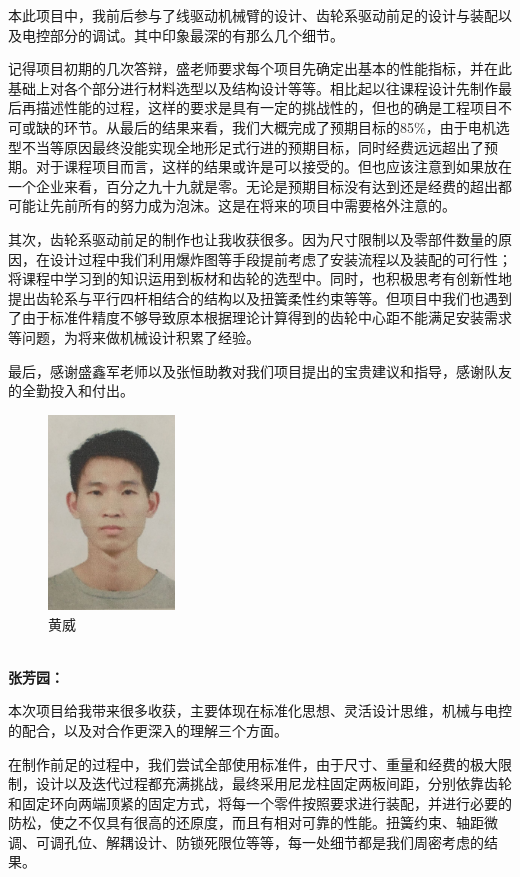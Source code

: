 \documentclass[12pt]{article}
\begin{document}
\begin{CJK}{UTF8}{gbsn}
本此项目中，我前后参与了线驱动机械臂的设计、齿轮系驱动前足的设计与装配以及电控部分的调试。其中印象最深的有那么几个细节。\par
记得项目初期的几次答辩，盛老师要求每个项目先确定出基本的性能指标，并在此基础上对各个部分进行材料选型以及结构设计等等。相比起以往课程设计先制作最后再描述性能的过程，这样的要求是具有一定的挑战性的，但也的确是工程项目不可或缺的环节。从最后的结果来看，我们大概完成了预期目标的85$\%$，由于电机选型不当等原因最终没能实现全地形足式行进的预期目标，同时经费远远超出了预期。对于课程项目而言，这样的结果或许是可以接受的。但也应该注意到如果放在一个企业来看，百分之九十九就是零。无论是预期目标没有达到还是经费的超出都可能让先前所有的努力成为泡沫。这是在将来的项目中需要格外注意的。\par
其次，齿轮系驱动前足的制作也让我收获很多。因为尺寸限制以及零部件数量的原因，在设计过程中我们利用爆炸图等手段提前考虑了安装流程以及装配的可行性；将课程中学习到的知识运用到板材和齿轮的选型中。同时，也积极思考有创新性地提出齿轮系与平行四杆相结合的结构以及扭簧柔性约束等等。但项目中我们也遇到了由于标准件精度不够导致原本根据理论计算得到的齿轮中心距不能满足安装需求等问题，为将来做机械设计积累了经验。\par
最后，感谢盛鑫军老师以及张恒助教对我们项目提出的宝贵建议和指导，感谢队友的全勤投入和付出。
\begin{figure}[H]
\centering
\includegraphics[width=0.3\textwidth]{photo//hw.jpg}
\caption{黄威}
\end{figure}
~\\
\textbf{张芳园：}\par
本次项目给我带来很多收获，主要体现在标准化思想、灵活设计思维，机械与电控的配合，以及对合作更深入的理解三个方面。\par
在制作前足的过程中，我们尝试全部使用标准件，由于尺寸、重量和经费的极大限制，设计以及迭代过程都充满挑战，最终采用尼龙柱固定两板间距，分别依靠齿轮和固定环向两端顶紧的固定方式，将每一个零件按照要求进行装配，并进行必要的防松，使之不仅具有很高的还原度，而且有相对可靠的性能。扭簧约束、轴距微调、可调孔位、解耦设计、防锁死限位等等，每一处细节都是我们周密考虑的结果。\par

\end{CJK}
\end{document}
